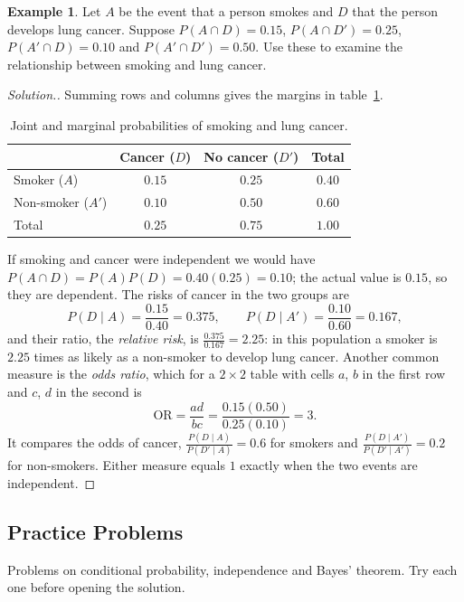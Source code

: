 \documentclass[12pt,a4paper]{report}
\theoremstyle{definition}
\newtheorem{example}[thm]{Example}
\theoremstyle{plain}
\theoremstyle{definition}
\newenvironment{solution}
  {\renewcommand{\qedsymbol}{}\begin{proof}[\textit{Solution}.]}
  {\end{proof}}
\begin{document}
\begin{example}
\label{ex:smoking}
Let $A$ be the event that a person smokes and $D$ that the person develops lung
cancer. Suppose $P(A\cap D) = 0.15$, $P(A\cap D') = 0.25$, $P(A'\cap D) = 0.10$ and
$P(A'\cap D') = 0.50$. Use these to examine the relationship between smoking and lung
cancer.
\end{example}

\begin{solution}
Summing rows and columns gives the margins in table~\ref{tab:smoking}.
\begin{table}[H]
\centering\renewcommand{\arraystretch}{1.5}
\caption{Joint and marginal probabilities of smoking and lung cancer.}
\label{tab:smoking}
\begin{tabular}{|l|c|c|c|}
\hline
 & Cancer ($D$) & No cancer ($D'$) & Total\\
\hline
Smoker ($A$) & $0.15$ & $0.25$ & $0.40$\\
\hline
Non-smoker ($A'$) & $0.10$ & $0.50$ & $0.60$\\
\hline
Total & $0.25$ & $0.75$ & $1.00$\\
\hline
\end{tabular}
\end{table}
If smoking and cancer were independent we would have $P(A\cap D) = P(A)P(D) = 0.40(0.25) = 0.10$;
the actual value is $0.15$, so they are dependent. The risks of cancer in the two groups are
\[P(D\mid A) = \frac{0.15}{0.40} = 0.375,\qquad P(D\mid A') = \frac{0.10}{0.60} = 0.167,\]
and their ratio, the \emph{relative risk}, is $\frac{0.375}{0.167} = 2.25$: in this population
a smoker is $2.25$ times as likely as a non-smoker to develop lung cancer. Another common
measure is the \emph{odds ratio}, which for a $2\times 2$ table with cells $a$, $b$ in the
first row and $c$, $d$ in the second is
\[\text{OR} = \frac{ad}{bc} = \frac{0.15(0.50)}{0.25(0.10)} = 3 .\]
It compares the odds of cancer, $\frac{P(D\mid A)}{P(D'\mid A)} = 0.6$ for smokers and
$\frac{P(D\mid A')}{P(D'\mid A')} = 0.2$ for non-smokers. Either measure equals $1$ exactly when
the two events are independent.
\end{solution}

\subsection{Practice Problems}

Problems on conditional probability, independence and Bayes' theorem. Try each one
before opening the solution.
\end{document}
